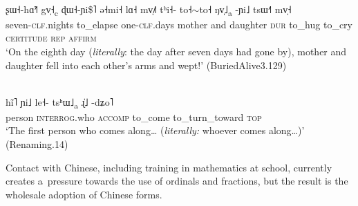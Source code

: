  \begin{exe}
 	\ex
 	\\
 	\label{ex:seventh}
 	\gll ʂɯ˧-hɑ̃˧˥					gv̩˧\textsubscript{c}			ɖɯ˧-ɲi\$˥					ə˧mi˧		lɑ˧		mv̩˩˥		tʰi˧-		to˧{$\sim$}to˧		ŋv̩˩\textsubscript{a}		-ɲi˩		tsɯ˧˥		mv̩˧\\
 	seven-\textsc{clf}.nights	to\_elapse		one-\textsc{clf}.days	mother		and		daughter		\textsc{dur}	to\_hug		to\_cry			\textsc{certitude}		\textsc{rep}		\textsc{affirm}\\
 	\glt ‘On the eighth day (\textit{literally}: the day after seven days had gone by), mother and daughter fell into each other's arms and wept!' (BuriedAlive3.129)
 \end{exe}


 \begin{exe}
 	\ex
 	\\
 	\label{ex:bridge}
 	\gll hĩ˥		ɲi˩							le˧-					tsʰɯ˩\textsubscript{a}		ɻ̍˩								-dʑo˥\\
 	person		\textsc{interrog}.who	\textsc{accomp}		to\_come					to\_turn\_toward	\textsc{top}\\
 	\glt ‘The first person who comes along{\dots} (\textit{literally:} whoever comes along{\dots})' (Renaming.14)
 \end{exe}

Contact with Chinese, including training in mathematics at school, currently creates a~pressure towards the use of ordinals and fractions, but the result is the wholesale adoption of Chinese forms. 


